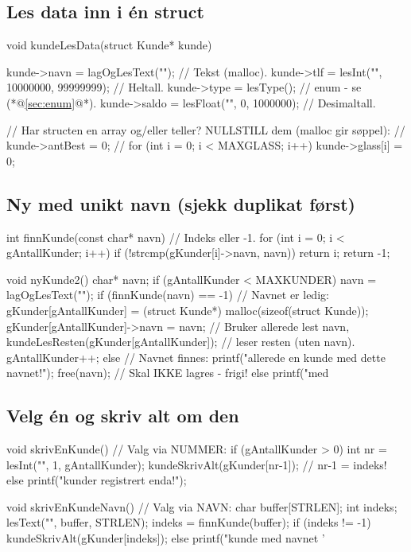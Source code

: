 \subsection{Les data inn i én struct}\label{sec:lesdata}
\begin{kode}[escapeinside={(*@}{@*)}]
void kundeLesData(struct Kunde* kunde)  {
  kunde->navn  = lagOgLesText("\tNavn");                  //  Tekst (malloc).
  kunde->tlf   = lesInt("\tTelefon", 10000000, 99999999); //  Heltall.
  kunde->type  = lesType();                               //  enum - se (*@{\ttfamily\footnotesize\color{cm}\ref{sec:enum}}@*).
  kunde->saldo = lesFloat("\tSaldo", 0, 1000000);         //  Desimaltall.

  //  Har structen en array og/eller teller? NULLSTILL dem (malloc gir søppel):
  //  kunde->antBest = 0;
  //  for (int i = 0;  i < MAXGLASS;  i++)  kunde->glass[i] = 0;
}
\end{kode}

\subsection{Ny med unikt navn (sjekk duplikat først)}\label{sec:unik}
\begin{kode}
int finnKunde(const char* navn)  {                 //  Indeks eller -1.
  for (int i = 0;  i < gAntallKunder;  i++)
      if (!strcmp(gKunder[i]->navn, navn))  return i;
  return -1;
}

void nyKunde2()  {
  char* navn;
  if (gAntallKunder < MAXKUNDER)  {
     navn = lagOgLesText("\tNavn");
     if (finnKunde(navn) == -1)  {                 //  Navnet er ledig:
        gKunder[gAntallKunder] = (struct Kunde*) malloc(sizeof(struct Kunde));
        gKunder[gAntallKunder]->navn = navn;       //  Bruker allerede lest navn,
        kundeLesResten(gKunder[gAntallKunder]);    //    leser resten (uten navn).
        gAntallKunder++;
     } else  {                                     //  Navnet finnes:
        printf("\n\tFinnes allerede en kunde med dette navnet!\n");
        free(navn);                                //  Skal IKKE lagres - frigi!
     }
  } else
     printf("\n\tFullt med %
}
\end{kode}

\subsection{Velg én og skriv alt om den}\label{sec:velgen}
\begin{kode}
void skrivEnKunde()  {                             //  Valg via NUMMER:
  if (gAntallKunder > 0)  {
     int nr = lesInt("\tKundenr", 1, gAntallKunder);
     kundeSkrivAlt(gKunder[nr-1]);                 //  nr-1 = indeks!
  } else
     printf("\n\tIngen kunder registrert enda!\n");
}

void skrivEnKundeNavn()  {                         //  Valg via NAVN:
  char buffer[STRLEN];
  int  indeks;
  lesText("\tNavn", buffer, STRLEN);
  indeks = finnKunde(buffer);
  if (indeks != -1)  kundeSkrivAlt(gKunder[indeks]);
  else  printf("\n\tIngen kunde med navnet '%
}
\end{kode}

